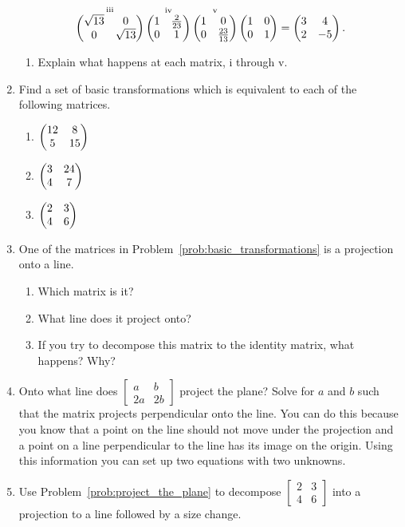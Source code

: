 \documentclass[../gatm_answers.tex]{subfiles}
\begin{document}
\begin{enumerate}
$$\mathop{\begin{pmatrix} \sqrt{13} & 0 \\ 0 & \sqrt{13} \end{pmatrix}}^{\text{iii}}
\mathop{\begin{pmatrix} 1 & \frac{2}{23} \\ 0 & 1 \end{pmatrix}}^{\text{iv}}
\mathop{\begin{pmatrix} 1 & 0 \\ 0 & \frac{23}{13} \end{pmatrix}}^{\text{v}}
\begin{pmatrix} 1 & 0 \\ 0 & 1 \end{pmatrix}=\begin{pmatrix} 3 & 4 \\ 2 & -5 \end{pmatrix}.$$
\begin{enumerate}
\item Explain what happens at each matrix, i through v.
\end{enumerate}
\item Find a set of basic transformations which is equivalent to each of the following matrices.\label{prob:basic_transformations}
\begin{multicols}{3}
\begin{enumerate}
\item $\begin{pmatrix} 12 & 8 \\ 5 & 15 \end{pmatrix}$
\item $\begin{pmatrix} 3 & 24 \\ 4 & 7 \end{pmatrix}$
\item $\begin{pmatrix} 2 & 3 \\ 4 & 6 \end{pmatrix}$
\end{enumerate}
\end{multicols}
\item One of the matrices in Problem~\ref{prob:basic_transformations} is a projection onto a line.
\begin{multicols}{2}
\begin{enumerate}
\item Which matrix is it?
\item What line does it project onto?
\item If you try to decompose this matrix to the identity matrix, what happens? Why?
\end{enumerate}
\end{multicols}
\item Onto what line does $\left[\begin{smallmatrix} a & b \\ 2a & 2b\end{smallmatrix}\right]$ project the plane? Solve for $a$ and $b$ such that the matrix projects perpendicular onto the line. You can do this because you know that a point on the line should not move under the projection and a point on a line perpendicular to the line has its image on the origin. Using this information you can set up two equations with two unknowns. \label{prob:project_the_plane}
\item Use Problem~\ref{prob:project_the_plane} to decompose $\left[\begin{smallmatrix} 2 & 3 \\ 4 & 6 \end{smallmatrix}\right]$ into a projection to a line followed by a size change.

\end{enumerate}
\end{document}
